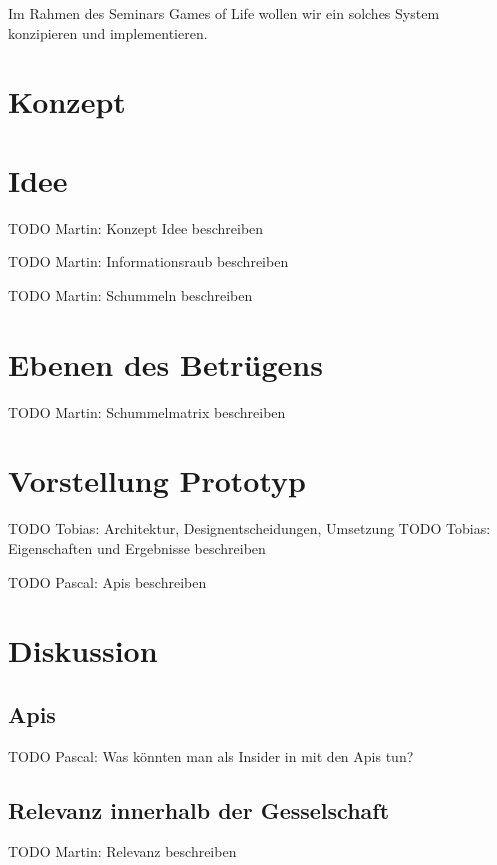 \documentclass[german]{cgspaper} %
\newcommand{\Martin}[1]{ \textcolor{colorMartin}{TODO Martin:} #1 }
\newcommand{\Pascal}[1]{ \textcolor{colorPascal}{TODO Pascal:} #1 }
\newcommand{\Tobias}[1]{ \textcolor{colorTobias}{TODO Tobias:} #1 }
\begin{document}
Im Rahmen des Seminars Games of Life wollen wir ein solches System konzipieren und implementieren.

\section{Konzept}



\section{Idee}
\Martin{Konzept Idee beschreiben}

\Martin{Informationsraub beschreiben}

\Martin{Schummeln beschreiben}

\section{Ebenen des Betrügens}

\Martin{Schummelmatrix beschreiben}

\section{Vorstellung Prototyp}

\Tobias{Architektur, Designentscheidungen, Umsetzung}
\Tobias{Eigenschaften und Ergebnisse beschreiben}

\Pascal{Apis beschreiben}

\section{Diskussion}

\subsection{Apis}

\Pascal{Was könnten man als Insider in mit den Apis tun?}

\subsection{Relevanz innerhalb der Gesselschaft}

\Martin{Relevanz beschreiben}





\end{document}
